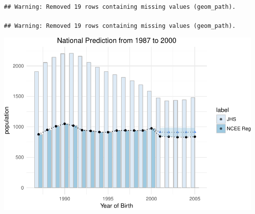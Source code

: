 \documentclass[]{article}
\begin{document}
\begin{verbatim}
## Warning: Removed 19 rows containing missing values (geom_path).

## Warning: Removed 19 rows containing missing values (geom_path).
\end{verbatim}

\includegraphics{NCEE_files/figure-latex/unnamed-chunk-6-1.pdf}
\end{document}

